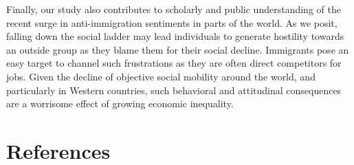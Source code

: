 \documentclass[
  11pt,
]{article}
\begin{document}
Finally, our study also contributes to scholarly and public
understanding of the recent surge in anti-immigration sentiments in
parts of the world. As we posit, falling down the social ladder may lead
individuals to generate hostility towards an outside group as they blame
them for their social decline. Immigrants pose an easy target to channel
such frustrations as they are often direct competitors for jobs. Given
the decline of objective social mobility around the world, and
particularly in Western countries, such behavioral and attitudinal
consequences are a worrisome effect of growing economic inequality.

\newpage

\hypertarget{references}{%
\section*{References}\label{references}}
\end{document}
